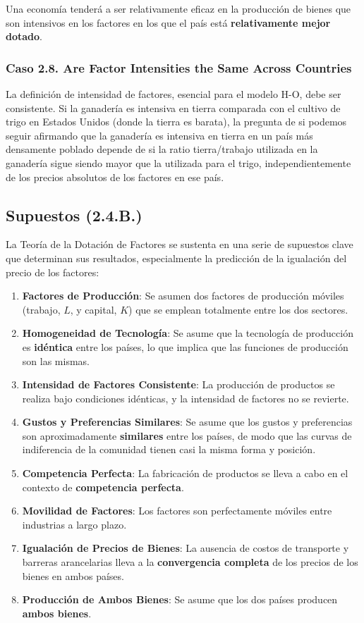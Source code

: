 \begin{propuesta}
Una economía tenderá a ser relativamente eficaz en la producción de bienes que son intensivos en los factores en los que el país está \textbf{relativamente mejor dotado}.
\end{propuesta}

\subsubsection{Caso 2.8. Are Factor Intensities the Same Across Countries}
La definición de intensidad de factores, esencial para el modelo H-O, debe ser consistente. Si la ganadería es intensiva en tierra comparada con el cultivo de trigo en Estados Unidos (donde la tierra es barata), la pregunta de si podemos seguir afirmando que la ganadería es intensiva en tierra en un país más densamente poblado depende de si la ratio tierra/trabajo utilizada en la ganadería sigue siendo mayor que la utilizada para el trigo, independientemente de los precios absolutos de los factores en ese país.

\subsection{Supuestos (2.4.B.)}
La Teoría de la Dotación de Factores se sustenta en una serie de supuestos clave que determinan sus resultados, especialmente la predicción de la igualación del precio de los factores:

\begin{enumerate}
    \item \textbf{Factores de Producción}: Se asumen dos factores de producción móviles (trabajo, $L$, y capital, $K$) que se emplean totalmente entre los dos sectores.
    \item \textbf{Homogeneidad de Tecnología}: Se asume que la tecnología de producción es \textbf{idéntica} entre los países, lo que implica que las funciones de producción son las mismas.
    \item \textbf{Intensidad de Factores Consistente}: La producción de productos se realiza bajo condiciones idénticas, y la intensidad de factores no se revierte.
    \item \textbf{Gustos y Preferencias Similares}: Se asume que los gustos y preferencias son aproximadamente \textbf{similares} entre los países, de modo que las curvas de indiferencia de la comunidad tienen casi la misma forma y posición.
    \item \textbf{Competencia Perfecta}: La fabricación de productos se lleva a cabo en el contexto de \textbf{competencia perfecta}.
    \item \textbf{Movilidad de Factores}: Los factores son perfectamente móviles entre industrias a largo plazo.
    \item \textbf{Igualación de Precios de Bienes}: La ausencia de costos de transporte y barreras arancelarias lleva a la \textbf{convergencia completa} de los precios de los bienes en ambos países.
    \item \textbf{Producción de Ambos Bienes}: Se asume que los dos países producen \textbf{ambos bienes}.
\end{enumerate}

